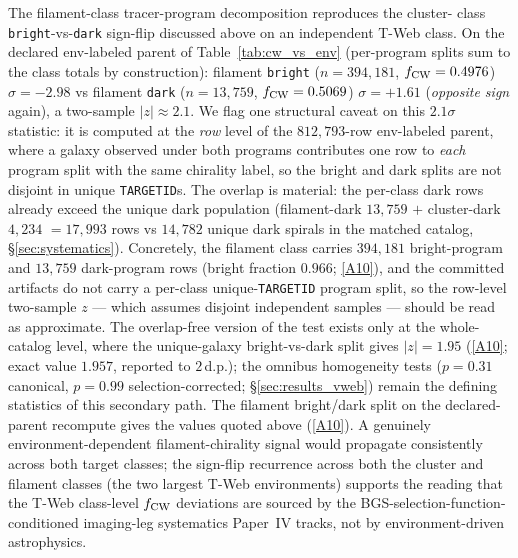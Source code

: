 \documentclass[aps,prd,twocolumn,superscriptaddress,showpacs,preprintnumbers,nofootinbib,longbibliography,floatfix]{revtex4-2}
\newcommand{\repoBase}{https://github.com/Hubify-Projects/bigbounce/blob/main}
\begin{document}
The filament-class tracer-program decomposition reproduces the cluster-
class \texttt{bright}-vs-\texttt{dark} sign-flip discussed above on an
independent T-Web class. On the declared env-labeled parent of
Table~\ref{tab:cw_vs_env} (per-program splits sum to the class totals
by construction): filament \texttt{bright} ($n = 394{,}181$,
$f_{\rm CW} = 0.4976$) $\sigma = -2.98$ vs filament \texttt{dark}
($n = 13{,}759$, $f_{\rm CW} = 0.5069$)
$\sigma = +1.61$ (\emph{opposite sign} again), a two-sample
$|z| \approx 2.1$. We flag one structural caveat on this $2.1\sigma$
statistic: it is computed at the \emph{row} level of the
$812{,}793$-row env-labeled parent, where a galaxy observed under
both programs contributes one row to \emph{each} program split with
the same chirality label, so the bright and dark splits are not
disjoint in unique \texttt{TARGETID}s. The overlap is material: the
per-class dark rows already exceed the unique dark population
(filament-dark $13{,}759$ $+$ cluster-dark $4{,}234$ $= 17{,}993$
rows vs $14{,}782$ unique dark spirals in the matched catalog,
\S\ref{sec:systematics}). Concretely, the filament class carries
$394{,}181$ bright-program and $13{,}759$ dark-program rows
(bright fraction $0.966$;
\href{\repoBase/pipelines/p5\_desi\_chirality/outputs/17\_v0151\_closure\_recomputes.json}{[A10]}),
and the committed artifacts do not carry a
per-class unique-\texttt{TARGETID} program split, so the row-level
two-sample $z$ — which assumes disjoint independent samples — should
be read as approximate. The overlap-free version of the test exists
only at the whole-catalog level, where the unique-galaxy
bright-vs-dark split gives $|z| = 1.95$
(\href{\repoBase/pipelines/p5\_desi\_chirality/outputs/17\_v0151\_closure\_recomputes.json}{[A10]};
exact value $1.957$, reported to $2$\,d.p.);
the omnibus homogeneity tests
($p = 0.31$ canonical, $p = 0.99$ selection-corrected;
\S\ref{sec:results_vweb}) remain the defining statistics of this
secondary path. The filament bright/dark split on the declared-parent recompute
gives the values quoted above
(\href{\repoBase/pipelines/p5\_desi\_chirality/outputs/17\_v0151\_closure\_recomputes.json}{[A10]}).
A genuinely environment-dependent
filament-chirality signal would propagate consistently across both
target classes; the sign-flip recurrence across both the cluster and
filament classes (the two largest T-Web environments) supports the
reading that the T-Web class-level $f_{\rm CW}$ deviations are sourced
by the BGS-selection-function-conditioned imaging-leg systematics
Paper~IV tracks, not by environment-driven astrophysics.
\end{document}
